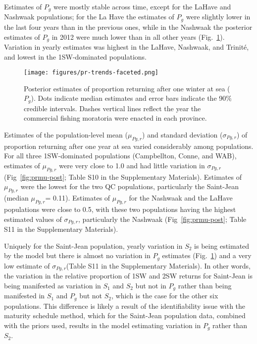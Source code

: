 \documentclass[12pt]{article}
\newcommand{\So}{$S_{1}$\xspace}
\newcommand{\St}{$S_{2}$\xspace}
\newcommand{\Pg}{$P_g$\xspace}
\newcommand{\prmu}{$\mu_{Pg,r}$\xspace}
\newcommand{\prsig}{$\sigma_{Pg,r}$\xspace}
\begin{document}
Estimates of \Pg were mostly stable across time, except for the LaHave and
Nashwaak populations; for the La Have the estimates of \Pg were slightly lower in the last
four years than in the previous ones, while in the Nashwaak the posterior
estimates of \Pg in 2012 were much lower than in all other years
(Fig.~\ref{fig:pr-faceted}). Variation in yearly estimates was highest in the
LaHave, Nashwaak, and Trinit\'{e}, and lowest in the 1SW-dominated
populations.

\begin{figure}[htbp] \centering
    \texttt{[image: figures/pr-trends-faceted.png]}
    \caption{Posterior estimates of proportion returning after one winter at sea (\Pg).
 Dots indicate median estimates and error
        bars indicate the 90\% credible intervals. Dashes vertical lines reflect the year the commercial fishing moratoria were enacted
    in each province.} \label{fig:pr-faceted}
\end{figure}

Estimates of the population-level mean (\prmu) and standard deviation (\prsig)
of proportion returning after one year at sea varied considerably among populations.
For all
three 1SW-dominated populations (Campbellton, Conne, and WAB), estimates of \prmu
were very close to 1.0 and had little variation in \prsig (Fig~\ref{fig:prmu-post}; Table S10 in the Supplementary Materials).
Estimates of \prmu were the lowest for the two QC populations, particularly the Saint-Jean (median \prmu = 0.11).
Estimates of \prmu for the Nashwaak and the LaHave populations were close to 0.5, with these two populations having
the highest estimated values of \prsig, particularly the Nashwaak (Fig~\ref{fig:prmu-post};  Table S11 in the Supplementary Materials).

Uniquely for the Saint-Jean population, yearly variation in \St is being
estimated by the model but there is almost no variation in \Pg estimates
(Fig.~\ref{fig:pr-faceted}) and a very low estimate of \prsig (Table S11
in the Supplementary Materials). In other words, the variation in the relative
proportion of 1SW and 2SW returns for Saint-Jean is being manifested as
variation in \So and \St but not in \Pg rather than being manifested in \So
and \Pg but not \St, which is the case for the other six populations. This
difference is likely a result of the identifiability issue with the maturity
schedule method, which for the Saint-Jean population data, combined with the priors
used, results in the model estimating variation in \Pg rather than \St.
\end{document}
